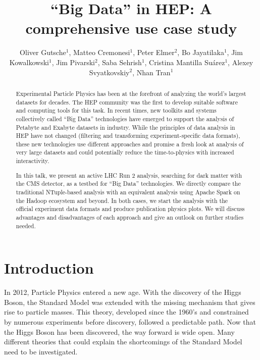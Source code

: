 \documentclass[a4paper]{jpconf}
\begin{document}
\title{“Big Data” in HEP: A comprehensive use case study}

\author{Oliver Gutsche$^1$, Matteo Cremonesi$^1$, Peter Elmer$^2$, Bo Jayatilaka$^1$, Jim Kowalkowski$^1$, Jim Pivarski$^2$, Saba Sehrish$^1$, Cristina Mantilla Suárez$^1$, Alexey Svyatkovskiy$^2$, Nhan Tran$^1$}

\address{$^1$Fermi National Accelerator Laboratory, Batavia, IL, USA}
\address{$^2$Princeton University, Princeton, NJ, USA}


\begin{abstract}
Experimental Particle Physics has been at the forefront of analyzing the world’s largest datasets for decades. The HEP community was the first to develop suitable software and computing tools for this task. In recent times, new toolkits and systems collectively called “Big Data” technologies have emerged to support the analysis of Petabyte and Exabyte datasets in industry. While the principles of data analysis in HEP have not changed (filtering and transforming experiment-specific data formats), these new technologies use different approaches and promise a fresh look at analysis of very large datasets and could potentially reduce the time-to-physics with increased interactivity.

In this talk, we present an active LHC Run 2 analysis, searching for dark matter with the CMS detector, as a testbed for “Big Data” technologies. We directly compare the traditional NTuple-based analysis with an equivalent analysis using Apache Spark on the Hadoop ecosystem and beyond. In both cases, we start the analysis with the official experiment data formats and produce publication physics plots. We will discuss advantages and disadvantages of each approach and give an outlook on further studies needed.
\end{abstract}

\section{Introduction}

In 2012, Particle Physics entered a new age. With the discovery of the Higgs Boson, the Standard Model was extended with the missing mechanism that gives rise to particle masses. This theory, developed since the 1960's and constrained by numerous experiments before discovery, followed a predictable path. Now that the Higgs Boson has been discovered, the way forward is wide open. Many different theories that could explain the shortcomings of the Standard Model need to be investigated.
\end{document}
